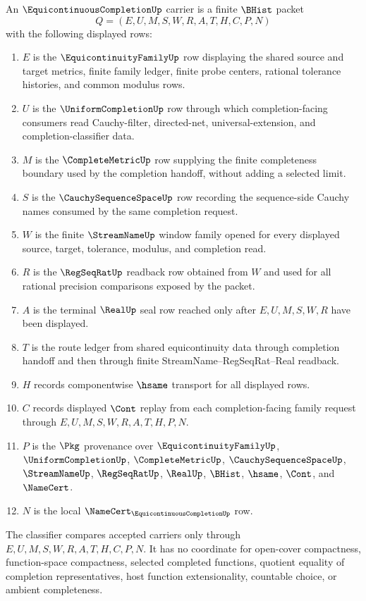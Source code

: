 \begin{definition}
\label{def:equicontinuous-completion-carrier}
An $\EquicontinuousCompletionUp$ carrier is a finite $\BHist$ packet
$$
Q=(E,U,M,S,W,R,A,T,H,C,P,N)
$$
with the following displayed rows:
\begin{enumerate}
\item $E$ is the $\EquicontinuityFamilyUp$ row displaying the shared source
and target metrics, finite family ledger, finite probe centers, rational
tolerance histories, and common modulus rows.
\item $U$ is the $\UniformCompletionUp$ row through which completion-facing
consumers read Cauchy-filter, directed-net, universal-extension, and
completion-classifier data.
\item $M$ is the $\CompleteMetricUp$ row supplying the finite completeness
boundary used by the completion handoff, without adding a selected limit.
\item $S$ is the $\CauchySequenceSpaceUp$ row recording the sequence-side
Cauchy names consumed by the same completion request.
\item $W$ is the finite $\StreamNameUp$ window family opened for every
displayed source, target, tolerance, modulus, and completion read.
\item $R$ is the $\RegSeqRatUp$ readback row obtained from $W$ and used for
all rational precision comparisons exposed by the packet.
\item $A$ is the terminal $\RealUp$ seal row reached only after
$E,U,M,S,W,R$ have been displayed.
\item $T$ is the route ledger from shared equicontinuity data through
completion handoff and then through finite StreamName--RegSeqRat--Real
readback.
\item $H$ records componentwise $\hsame$ transport for all displayed rows.
\item $C$ records displayed $\Cont$ replay from each completion-facing family
request through $E,U,M,S,W,R,A,T,H,P,N$.
\item $P$ is the $\Pkg$ provenance over $\EquicontinuityFamilyUp$,
$\UniformCompletionUp$, $\CompleteMetricUp$, $\CauchySequenceSpaceUp$,
$\StreamNameUp$, $\RegSeqRatUp$, $\RealUp$, $\BHist$, $\hsame$, $\Cont$,
and $\NameCert$.
\item $N$ is the local $\NameCert_{\EquicontinuousCompletionUp}$ row.
\end{enumerate}
The classifier compares accepted carriers only through
$E,U,M,S,W,R,A,T,H,C,P,N$. It has no coordinate for open-cover compactness,
function-space compactness, selected completed functions, quotient equality
of completion representatives, host function extensionality, countable
choice, or ambient completeness.
\end{definition}

